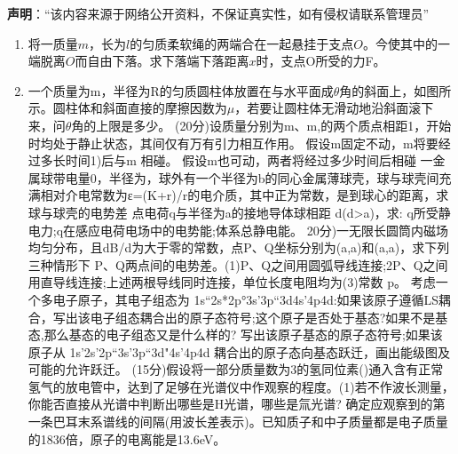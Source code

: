 

\textbf{声明}：“该内容来源于网络公开资料，不保证真实性，如有侵权请联系管理员”

\begin{enumerate}
\item 将一质量$m$，长为$l$的匀质柔软绳的两端合在一起悬挂于支点$O$。今使其中的一端脱离$O$而自由下落。求下落端下落距离$x$时，支点O所受的力F。
\item 一个质量为m，半径为R的匀质圆柱体放置在与水平面成$\theta$角的斜面上，如图所示。圆柱体和斜面直接的摩擦因数为$\mu$，若要让圆柱体无滑动地沿斜面滚下来，问$\theta$角的上限是多少。
(20分)设质量分别为m、m,的两个质点相距1，开始时均处于静止状态，其间仅有万有引力相互作用。
假设m固定不动，m将要经过多长时间1)后与m 相碰。
假设m也可动，两者将经过多少时间后相碰
一金属球带电量0，半径为，球外有一个半径为b的同心金属薄球壳，球与球壳间充满相对介电常数为ε=(K+r)/r的电介质，其中正为常数，是到球心的距离，求球与球壳的电势差
点电荷q与半径为a的接地导体球相距 d(d>a)，求:
q所受静电力;q在感应电荷电场中的电势能;体系总静电能。
20分)一无限长圆筒内磁场均匀分布，且dB/d为大于零的常数，点P、Q坐标分别为(a,a)和(a,a)，求下列三种情形下 P、Q两点间的电势差。(1)P、Q之间用圆弧导线连接;2P、Q之间用直导线连接;上述两根导线同时连接，单位长度电阻均为(3)常数 p。
考虑一个多电子原子，其电子组态为 1s“2s*2p°3s’3p“3d4s'4p4d:如果该原子遵循LS耦合，写出该电子组态耦合出的原子态符号;这个原子是否处于基态?如果不是基态,那么基态的电子组态又是什么样的?
写出该原子基态的原子态符号;如果该原子从 1s’2s’2p“3s’3p“3d"4s'4p4d 耦合出的原子态向基态跃迁，画出能级图及可能的允许跃迁。
(15分)假设将一部分质量数为3的氢同位素()通入含有正常氢气的放电管中，达到了足够在光谱仪中作观察的程度。(1)若不作波长测量，你能否直接从光谱中判断出哪些是H光谱，哪些是氚光谱?
确定应观察到的第一条巴耳末系谱线的间隔(用波长差表示)。已知质子和中子质量都是电子质量的1836倍，原子的电离能是13.6eV。
\end{enumerate}
